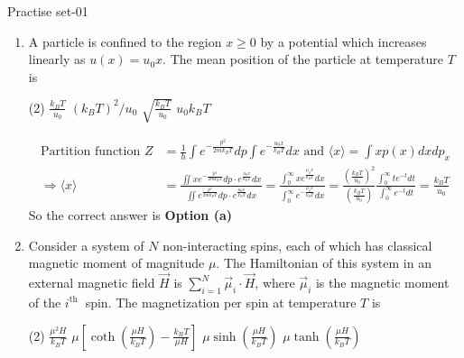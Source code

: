 \newpage
\begin{abox}
	Practise set-01
\end{abox}
\begin{enumerate}
	\item A particle is confined to the region $x \geq 0$ by a potential which increases linearly as $u(x)=u_{0} x$. The mean position of the particle at temperature $T$ is
	{	}
	 \begin{tasks}(2)
		\task[\textbf{a.}] $\frac{k_{B} T}{u_{0}}$
		\task[\textbf{b.}]$\left(k_{B} T\right)^{2} / u_{0}$
		\task[\textbf{c.}]$\sqrt{\frac{k_{B} T}{u_{0}}}$
		\task[\textbf{d.}]  $u_{0} k_{B} T$
	\end{tasks}
\begin{answer}
	\begin{align*}
	\text{Partition function }Z&=\frac{1}{h} \int e^{-\frac{p^{2}}{2 m k_{B} T}} d p \int e^{-\frac{u_{0} x}{k_{B} T}} d x\text{ and }\langle x\rangle=\int x p(x) d x d p_{x}\\
	\Rightarrow\langle x\rangle&=\frac{\iint x e^{-\frac{p^{2}}{2 m k_{B} T}} d p \cdot e^{\frac{u_{0} x}{k_{B} T}} d x}{\iint e^{\frac{p^{2}}{2 m k_{B} T}} d p \cdot e^{\frac{u_{0} x}{k_{B} T}} d x}=\frac{\int_{0}^{\infty} x e^{\frac{\mu_{0} x}{k_{B} T}} d x}{\int_{0}^{\infty} e^{-\frac{\mu_{0} x}{k_{B} T}} d x}=\frac{\left(\frac{k_{B} T}{u_{0}}\right)^{2}}{\left(\frac{k_{B} T}{u_{0}}\right)} \frac{\int_{0}^{\infty} t e^{-t} d t}{\int_{0}^{\infty} e^{-t} d t}=\frac{k_{B} T}{u_{0}}
	\end{align*}
	So the correct answer is \textbf{Option (a)}
\end{answer}
\item 	Consider a system of $N$ non-interacting spins, each of which has classical magnetic moment of magnitude $\mu$. The Hamiltonian of this system in an external magnetic field $\vec{H}$ is $\sum_{i=1}^{N} \vec{\mu}_{i} \cdot \vec{H}$, where $\vec{\mu}_{i}$ is the magnetic moment of the $i^{\text {th }}$ spin. The magnetization per spin at temperature $T$ is
{	}
	 \begin{tasks}(2)
		\task[\textbf{a.}]$\frac{\mu^{2} H}{k_{B} T}$
		\task[\textbf{b.}]$\mu\left[\operatorname{coth}\left(\frac{\mu H}{k_{B} T}\right)-\frac{k_{B} T}{\mu H}\right]$
		\task[\textbf{c.}] $\mu \sinh \left(\frac{\mu H}{k_{B} T}\right)$
		\task[\textbf{d.}] $\mu \tanh \left(\frac{\mu H}{k_{B} T}\right)$
	\end{tasks}
\begin{answer}
	\begin{align*}

\end{align*}
\end{answer}
\end{enumerate}
